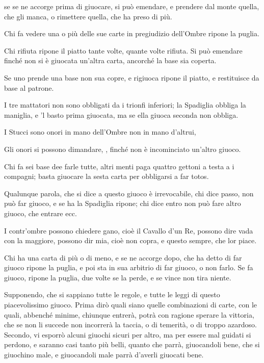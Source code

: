 \documentclass[11pt,a6paper]{article}
\begin{document}
\begin{list}
 se se ne accorge prima di giuocare, si può
emendare, e prendere dal monte quella,
che gli manca, o rimettere quella, che ha
preso di più.
\item Chi fa vedere una o più delle sue
carte in pregiudizio dell'Ombre ripone la
puglia.
\item Chi rifiuta ripone il piatto tante volte,
 quante volte rifiuta. Si può emendare finché
 non si è giuocata un'altra carta, ancorché
 la base sia coperta.
\item Se uno prende una base non sua copre,
 e rigiuoca ripone il piatto, e restituisce
 da base al patrone.
\item I tre mattatori non sono obbligati da
 i trionfi inferiori; la Spadiglia obbliga la
 maniglia, e 'l basto prima giuocata, ma se ella
 giuoca seconda non obbliga.
\item I Stucci sono onori in mano dell'Ombre
 non in mano d'altrui,
\item Gli onori si possono dimandare, , finché
 non è incominciato un'altro giuoco.
\item Chi fa sei base dee farle tutte, altri
 menti paga quattro gettoni a testa a i compagni;
 basta giuocare la sesta carta per obbligarsi
 a far totos.
\item Qualunque parola, che si dice a questo
 giuoco è irrevocabile, chi dice passo, non
 può far giuoco, e se ha la Spadiglia ripone;
 chi dice entro non può fare altro giuoco, che
 entrare ecc.
\item I contr'ombre possono chiedere gano,
 cioè il Cavallo d'un Re, possono dire vada
 con la maggiore, possono dir mia, cioè
 non copra, e questo sempre, che lor piace.
\item Chi ha una carta di più o di meno,
 e se ne accorge dopo, che ha detto di far
 giuoco ripone la puglia, e poi sta in sua arbitrio
 di far giuoco, o non farlo. Se fa giuoco,
 ripone la puglia, due volte se la perde, e se
 vince non tira niente.
\end{list}
Supponendo, che si sappiano tutte le regole,
e tutte le leggi di questo piacevolissimo
giuoco. Prima dirò quali siano quelle combinazioni
di carte, con le quali, abbenché minime,
chiunque entrerà, potrà con ragione
sperare la vittoria, che se non li succede non
incorrerà la taccia, o di temerità, o di
troppo azardoso. Secondo, vi esporrò alcuni giuochi
sicuri per altro, ma per essere mal guidati
si perdono, e saranno casi tanto più belli,
quanto che parrà, giuocandoli bene, che si
giuochino male, e giuocandoli male parrà
d'averli giuocati bene.
\end{document}
